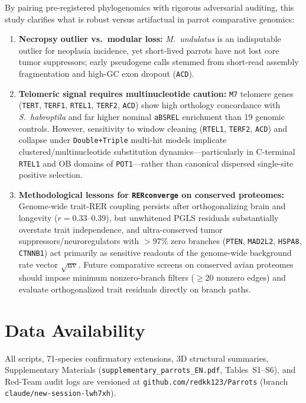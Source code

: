 \documentclass[10pt,a4paper,twocolumn]{article}
\begin{document}
By pairing pre-registered phylogenomics with rigorous adversarial auditing, this study clarifies what is robust versus artifactual in parrot comparative genomics:
\begin{enumerate}
    \item \textbf{Necropsy outlier vs.\ modular loss:} \textit{M.\ undulatus} is an indisputable outlier for neoplasia incidence, yet short-lived parrots have not lost core tumor suppressors; early pseudogene calls stemmed from short-read assembly fragmentation and high-GC exon dropout (\texttt{ACD}).
    \item \textbf{Telomeric signal requires multinucleotide caution:} \texttt{M7} telomere genes (\texttt{TERT}, \texttt{TERF1}, \texttt{RTEL1}, \texttt{TERF2}, \texttt{ACD}) show high orthology concordance with \textit{S.\ habroptila} and far higher nominal \texttt{aBSREL} enrichment than 19 genomic controls. However, sensitivity to window cleaning (\texttt{RTEL1}, \texttt{TERF2}, \texttt{ACD}) and collapse under \texttt{Double+Triple} multi-hit models implicate clustered/multinucleotide substitution dynamics—particularly in C-terminal \texttt{RTEL1} and OB domains of \texttt{POT1}—rather than canonical dispersed single-site positive selection.
    \item \textbf{Methodological lessons for \texttt{RERconverge} on conserved proteomes:} Genome-wide trait-RER coupling persists after orthogonalizing brain and longevity ($r = 0.33$--$0.39$), but unwhitened PGLS residuals substantially overstate trait independence, and ultra-conserved tumor suppressors/neuroregulators with $>97\%$ zero branches (\texttt{PTEN}, \texttt{MAD2L2}, \texttt{HSPA8}, \texttt{CTNNB1}) act primarily as sensitive readouts of the genome-wide background rate vector $\sqrt{\text{nv}}$. Future comparative screens on conserved avian proteomes should impose minimum nonzero-branch filters ($\ge 20$ nonzero edges) and evaluate orthogonalized trait residuals directly on branch paths.
\end{enumerate}

\section*{Data Availability}
All scripts, 71-species confirmatory extensions, 3D structural summaries, Supplementary Materials (\texttt{supplementary\_parrots\_EN.pdf}, Tables~S1--S6), and Red-Team audit logs are versioned at \texttt{github.com/redkk123/Parrots} (branch \texttt{claude/new-session-lwh7xh}).
\end{document}
